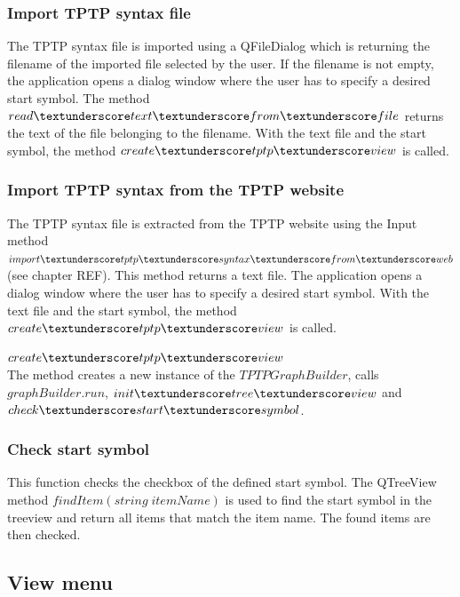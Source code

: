 \subsubsection{Import \ac{TPTP} syntax file}\label{sec:ImplementationGUIImportFile}

The \ac{TPTP} syntax file is imported using a QFileDialog which is returning the filename of the imported file selected by the user. If the filename is not empty, the application opens a dialog window where the user has to specify a desired start symbol. The method $read\textunderscore text\textunderscore from\textunderscore file$ returns the text of the file belonging to the filename. With the text file and the start symbol, the method $create\textunderscore tptp\textunderscore view$ is called.

\subsubsection{Import \ac{TPTP} syntax from the \ac{TPTP} website}\label{sec:ImplementationGUIImportInternet}

The \ac{TPTP} syntax file is extracted from the \ac{TPTP} website using the Input method $import\textunderscore tptp\textunderscore syntax\textunderscore from\textunderscore web$ (see chapter REF). This method returns a text file. The application opens a dialog window where the user has to specify a desired start symbol. With the text file and the start symbol, the method $create\textunderscore tptp\textunderscore view$ is called.

$create\textunderscore tptp\textunderscore view$ \\
The method creates a new instance of the $TPTPGraphBuilder$, calls $graphBuilder.run$, $init\textunderscore tree\textunderscore view$ and $check\textunderscore start\textunderscore symbol$.

\subsubsection{Check start symbol}\label{sec:ImplementationGUIStartsymbol}

This function checks the checkbox of the defined start symbol. The QTreeView method $findItem(string\; itemName)$ is used to find the start symbol in the treeview and return all items that match the item name. 
The found items are then checked.

\subsection{View menu}\label{sec:ImplementationGUIViewMenu}
